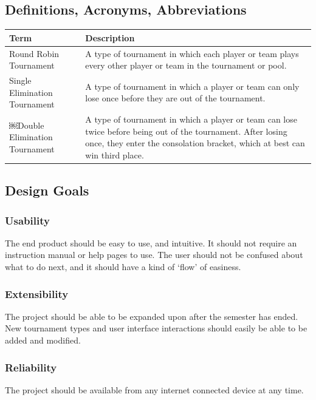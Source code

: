\documentclass{article}
\begin{document}
\subsection{Definitions, Acronyms, Abbreviations}
\begin{table}[h]
	\centering
	\begin{tabular}{p{3cm} p{8cm}}
		\toprule
		Term & Description  \\

		\midrule

		Round Robin Tournament & A type of tournament in which each player or team plays every other player or team in the tournament or pool. 		\\
		\midrule
		Single Elimination Tournament & A type of tournament in which a player or team can only lose once before they are out of the tournament.	\\
		\midrule
		￼Double Elimination Tournament & A type of tournament in which a player or team can lose twice before being out of the tournament. After losing once, they enter the consolation bracket, which at best can win third place.	\\

		\bottomrule
	\end{tabular}
\end{table}

\newpage
\subsection{Design Goals}
\subsubsection{Usability}
The end product should be easy to use, and intuitive. It should not require an instruction manual or help pages to use. The user should not be confused about what to do next, and it should have a kind of ‘flow’ of easiness.

\subsubsection{Extensibility}
The project should be able to be expanded upon after the semester has ended. New tournament types and user interface interactions should easily be able to be added and modified.

\subsubsection{Reliability}
The project should be available from any internet connected device at any time.
\end{document}
